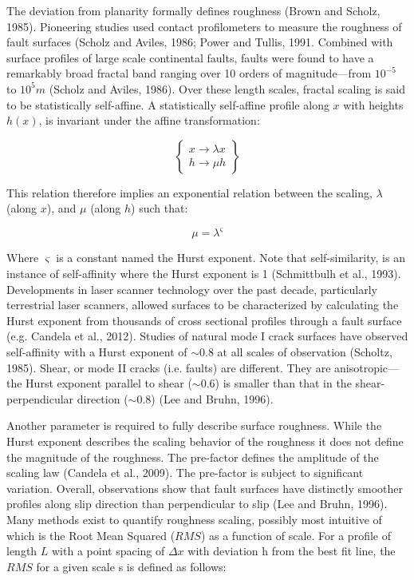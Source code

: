 \documentclass[12pt,a4paper]{article}
\begin{document}
The deviation from planarity formally defines roughness (Brown and Scholz, 1985). Pioneering studies used contact profilometers to measure the roughness of fault surfaces (Scholz and Aviles, 1986; Power and Tullis, 1991. Combined with surface profiles of large scale continental faults, faults were found to have a remarkably broad fractal band ranging over 10 orders of magnitude—from $10^{-5}$ to $10^5 m$ (Scholz and Aviles, 1986). Over these length scales, fractal scaling is said to be statistically self-affine. 	
A statistically self-affine profile along $x$ with heights $h(x)$, is invariant under the affine transformation:

\begin{equation}
\left\lbrace
  \begin{matrix}
   	x \rightarrow \lambda x \\
    h \rightarrow \mu h
  \end{matrix}
\right\rbrace
\end{equation}


This relation therefore implies an exponential relation between the scaling, $\lambda$ (along $x$), and $\mu$ (along $h$) such that:

\begin{equation}
\mu = \lambda^\varsigma
\end{equation}

Where $\varsigma$ is a constant named the Hurst exponent. Note that self-similarity, is an instance of self-affinity where the Hurst exponent is 1 (Schmittbulh et al., 1993). Developments in laser scanner technology over the past decade, particularly terrestrial laser scanners, allowed surfaces to be characterized by calculating the Hurst exponent from thousands of cross sectional profiles through a fault surface (e.g. Candela et al., 2012). Studies of natural mode I crack surfaces have observed self-affinity with a Hurst exponent of $\sim$0.8 at all scales of observation (Scholtz, 1985). Shear, or mode II cracks (i.e. faults) are different. They are anisotropic—the Hurst exponent parallel to shear ($\sim$0.6) is smaller than that in the shear-perpendicular direction ($\sim$0.8) (Lee and Bruhn, 1996). 

Another parameter is required to fully describe surface roughness. While the Hurst exponent describes the scaling behavior of the roughness it does not define the magnitude of the roughness. The pre-factor defines the amplitude of the scaling law (Candela et al., 2009). The pre-factor is subject to significant variation. Overall, observations show that fault surfaces have distinctly smoother profiles along slip direction than perpendicular to slip (Lee and Bruhn, 1996).
Many methods exist to quantify roughness scaling, possibly most intuitive of which is the Root Mean Squared ($RMS$) as a function of scale. For a profile of length $L$ with a point spacing of $\Delta x$ with deviation h from the best fit line, the $RMS$ for a given scale s is defined as follows:
\end{document}
